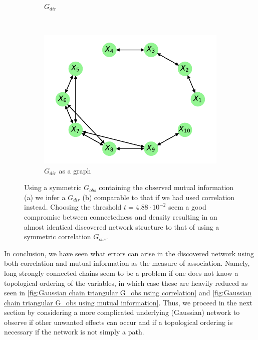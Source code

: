 \documentclass[../Thesis.tex]{subfiles}
\begin{document}
\begin{figure}[h]
\begin{subfigure}[t]{0.49\textwidth}
        \caption{$G_{dir}$}
    \end{subfigure}
    \\[\baselineskip]
    \begin{subfigure}[t]{0.49\textwidth}
        \centering
        \includegraphics[width=.9\linewidth]{figures/Gaussian Chain Theoretical/Chain graph from symmetric G obs - MI - cutoff 4_88e-2.pdf}
        \caption{$G_{dir}$ as a graph}
    \end{subfigure}
    \caption{Using a symmetric $G_{obs}$ containing the observed mutual information (a) we infer a $G_{dir}$ (b) comparable to that if we had used correlation instead. Choosing the threshold $t = 4.88 \cdot 10^{-2}$ seem a good compromise between connectedness and density resulting in an almost identical discovered network structure to that of using a symmetric correlation $G_{obs}$.}
    \label{fig:Gaussian chain symmetric G_obs using mutual information}
\end{figure}

In conclusion, we have seen what errors can arise in the discovered network using both correlation and mutual information as the measure of association. Namely, long strongly connected chains seem to be a problem if one does not know a topological ordering of the variables, in which case these are heavily reduced  as seen in \autoref{fig:Gaussian chain triangular G_obs using correlation} and \autoref{fig:Gaussian chain triangular G_obs using mutual information}. Thus, we proceed in the next section by considering a more complicated underlying (Gaussian) network to observe if other unwanted effects can occur and if a topological ordering is necessary if the network is not simply a path.
\end{document}
